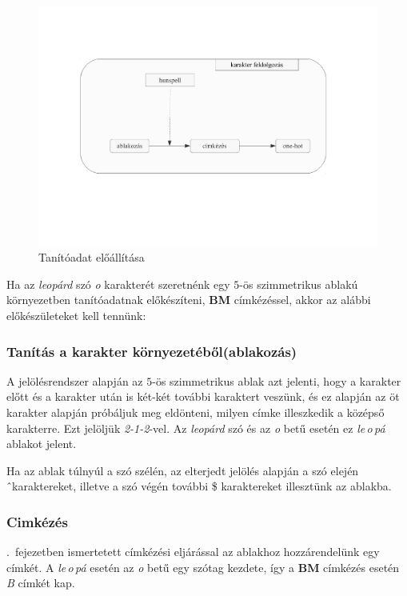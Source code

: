 \documentclass[a4paper, magyar]{article}
\newcommand{\Secref}[1]{\Aref{#1}.~fejezet}
\begin{document}
\begin{figure}[htp]
	\includegraphics[trim={0 6cm 0 4cm},clip,
	width=\textwidth]{figures/characters.pdf}
	\caption{Tanítóadat előállítása}\par\medskip\centering
	\label{fig:char}
\end{figure}

Ha az \textit{leopárd} szó \textit{o} karakterét szeretnénk egy $5$-ös szimmetrikus ablakú környezetben tanítóadatnak előkészíteni, \textbf{BM} címkézéssel, akkor az alábbi előkészületeket kell tennünk:
\subsubsection{Tanítás a karakter környezetéből(ablakozás)}

A jelölésrendszer alapján az $5$-ös szimmetrikus ablak azt jelenti, hogy a karakter előtt és a karakter után is két-két további karaktert veszünk, és ez alapján az öt karakter alapján próbáljuk meg eldönteni, milyen címke illeszkedik a középső karakterre. Ezt jelöljük \textit{2-1-2}-vel. Az \textit{leopárd} szó és az \textit{o} betű esetén ez \textit{le\,o\,pá} ablakot jelent.

Ha az ablak túlnyúl a szó szélén, az elterjedt jelölés alapján a szó elején \^\ karaktereket, illetve a szó végén további \$ karaktereket illesztünk az ablakba.
\subsubsection{Cimkézés}
\Secref{sec:cimke}ben ismertetett címkézési eljárással az ablakhoz hozzárendelünk egy címkét. A \textit{le\,o\,pá} esetén az \textit{o} betű egy szótag kezdete, így a \textbf{BM} címkézés esetén \textit{B} címkét kap.
\end{document}
